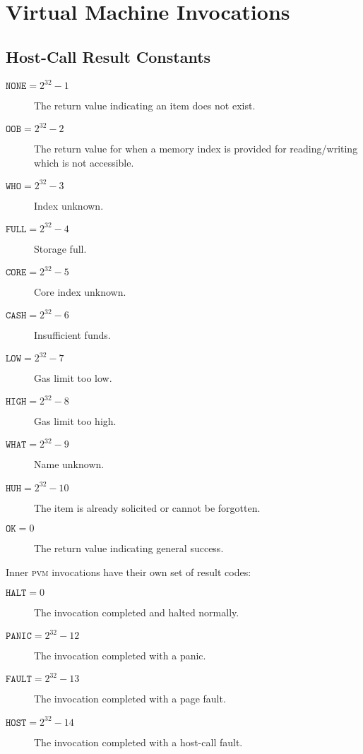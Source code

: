 \section{Virtual Machine Invocations}\label{sec:virtualmachineinvocations}

\newcommand*{\pvm}{\mathbf{M}}
\newcommand*{\segoff}{\pi}

\subsection{Host-Call Result Constants}

\begin{description}
  \item[$\mathtt{NONE} = 2^{32} - 1$] The return value indicating an item does not exist.
  \item[$\mathtt{OOB} = 2^{32} - 2$] The return value for when a memory index is provided for reading/writing which is not accessible.
  \item[$\mathtt{WHO} = 2^{32} - 3$] Index unknown.
  \item[$\mathtt{FULL} = 2^{32} - 4$] Storage full.
  \item[$\mathtt{CORE} = 2^{32} - 5$] Core index unknown.
  \item[$\mathtt{CASH} = 2^{32} - 6$] Insufficient funds.
  \item[$\mathtt{LOW} = 2^{32} - 7$] Gas limit too low.
  \item[$\mathtt{HIGH} = 2^{32} - 8$] Gas limit too high.
  \item[$\mathtt{WHAT} = 2^{32} - 9$] Name unknown.
  \item[$\mathtt{HUH} = 2^{32} - 10$] The item is already solicited or cannot be forgotten.
  \item[$\mathtt{OK} = 0$] The return value indicating general success.
\end{description}

Inner \textsc{pvm} invocations have their own set of result codes:
\begin{description}
  \item[$\mathtt{HALT} = 0$] The invocation completed and halted normally.
  \item[$\mathtt{PANIC} = 2^{32} - 12$] The invocation completed with a panic.
  \item[$\mathtt{FAULT} = 2^{32} - 13$] The invocation completed with a page fault.
  \item[$\mathtt{HOST} = 2^{32} - 14$] The invocation completed with a host-call fault.
\end{description}

